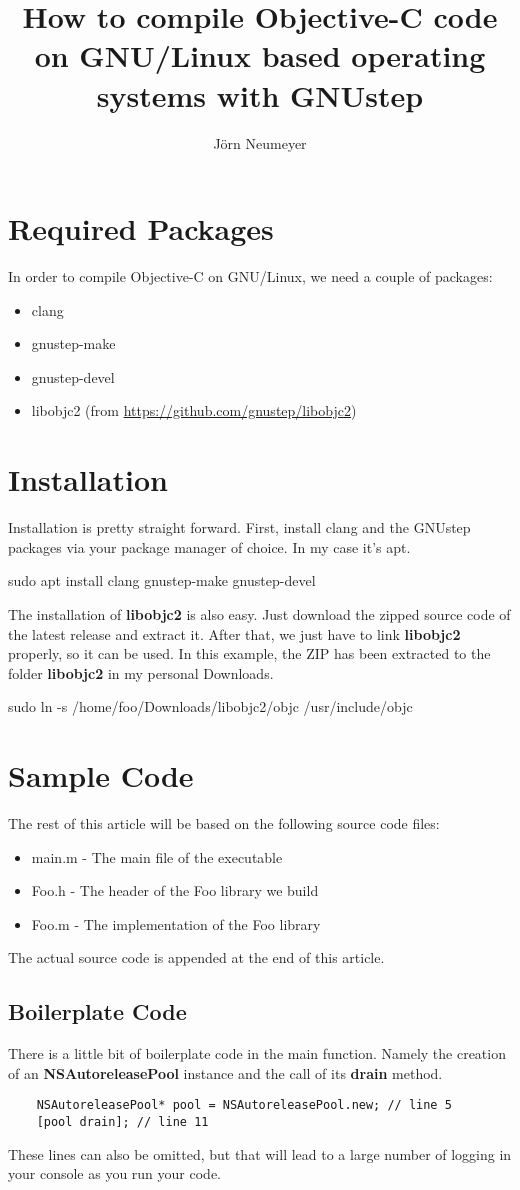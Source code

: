 \documentclass{article}
\title{How to compile Objective-C code on GNU/Linux based operating systems with GNUstep}
\author{J\"orn Neumeyer}
\begin{document}
  \maketitle
  \section{Required Packages}
  In order to compile Objective-C on GNU/Linux, we need a couple of packages:
  \begin{itemize}
    \item clang
    \item gnustep-make
    \item gnustep-devel
    \item libobjc2 (from \url{https://github.com/gnustep/libobjc2})
  \end{itemize}
  \section{Installation}
  Installation is pretty straight forward.
  First, install clang and the GNUstep packages via your package manager of choice. In my case it's apt.
  \begin{center}
    sudo apt install clang gnustep-make gnustep-devel
  \end{center}
  The installation of \textbf{libobjc2} is also easy.
  Just download the zipped source code of the latest release and extract it.
  After that, we just have to link \textbf{libobjc2} properly, so it can be used.
  In this example, the ZIP has been extracted to the folder \textbf{libobjc2} in my personal Downloads.
  \begin{center}
    sudo ln -s /home/foo/Downloads/libobjc2/objc /usr/include/objc
  \end{center}
  \section{Sample Code}
  The rest of this article will be based on the following source code files:
  \begin{itemize}
    \item main.m - The main file of the executable
    \item Foo.h - The header of the Foo library we build
    \item Foo.m - The implementation of the Foo library
  \end{itemize}
  The actual source code is appended at the end of this article.
  \subsection{Boilerplate Code}
  There is a little bit of boilerplate code in the main function.
  Namely the creation of an \textbf{NSAutoreleasePool} instance and the call of its \textbf{drain} method.
  \begin{lstlisting}
    NSAutoreleasePool* pool = NSAutoreleasePool.new; // line 5
    [pool drain]; // line 11
  \end{lstlisting}
  These lines can also be omitted, but that will lead to a large number of logging in your console as you run your code.
  \newpage
\end{document}
